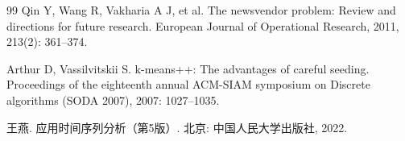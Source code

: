 \begin{thebibliography}{99}
   Qin Y, Wang R, Vakharia A J, et al. The newsvendor problem: Review and directions for future research. European Journal of Operational Research, 2011, 213(2): 361--374.

   Arthur D, Vassilvitskii S. k-means++: The advantages of careful seeding. Proceedings of the eighteenth annual ACM-SIAM symposium on Discrete algorithms (SODA 2007), 2007: 1027--1035.

   王燕. 应用时间序列分析（第5版）. 北京: 中国人民大学出版社, 2022.

\end{thebibliography}
